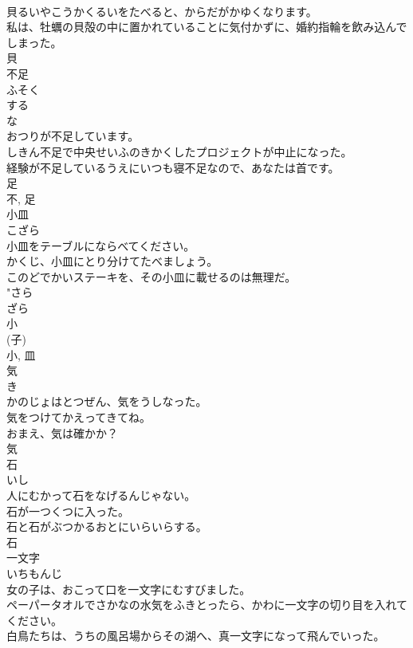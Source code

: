 \documentclass[8pt]{extreport}
\begin{document}
\begin{CJK}{UTF8}{min}
\\	貝るいやこうかくるいをたべると、からだがかゆくなります。	
\\	私は、牡蠣の貝殻の中に置かれていることに気付かずに、婚約指輪を飲み込んでしまった。	
\\	貝	
\\	不足	
\\	ふそく	
\\	する 
\\	な 
\\	おつりが不足しています。	
\\	しきん不足で中央せいふのきかくしたプロジェクトが中止になった。	
\\	経験が不足しているうえにいつも寝不足なので、あなたは首です。	
\\	足 
\\	不, 足	
\\	小皿	
\\	こざら	
\\	小皿をテーブルにならべてください。	
\\	かくじ、小皿にとり分けてたべましょう。	
\\	このどでかいステーキを、その小皿に載せるのは無理だ。	
\\	"さら 
\\	ざら 
\\	小 
\\	(子) 
\\	小, 皿	
\\	気	
\\	き	
\\	かのじょはとつぜん、気をうしなった。	
\\	気をつけてかえってきてね。	
\\	おまえ、気は確かか？	
\\	気	
\\	石	
\\	いし	
\\	人にむかって石をなげるんじゃない。	
\\	石が一つくつに入った。	
\\	石と石がぶつかるおとにいらいらする。	
\\	石	
\\	一文字	
\\	いちもんじ	
\\	女の子は、おこって口を一文字にむすびました。	
\\	ペーパータオルでさかなの水気をふきとったら、かわに一文字の切り目を入れてください。	
\\	白鳥たちは、うちの風呂場からその湖へ、真一文字になって飛んでいった。	

\end{CJK}
\end{document}

